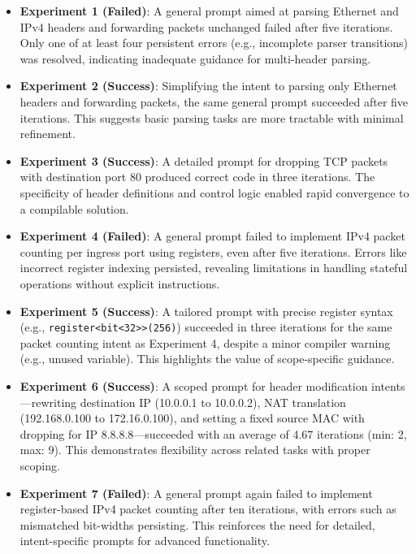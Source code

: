 \documentclass[sigconf]{acmart}
\begin{document}
\begin{itemize}
    \item \textbf{Experiment 1 (Failed)}: A general prompt aimed at parsing Ethernet and IPv4 headers and forwarding packets unchanged failed after five iterations. Only one of at least four persistent errors (e.g., incomplete parser transitions) was resolved, indicating inadequate guidance for multi-header parsing.
    \item \textbf{Experiment 2 (Success)}: Simplifying the intent to parsing only Ethernet headers and forwarding packets, the same general prompt succeeded after five iterations. This suggests basic parsing tasks are more tractable with minimal refinement.
    \item \textbf{Experiment 3 (Success)}: A detailed prompt for dropping TCP packets with destination port 80 produced correct code in three iterations. The specificity of header definitions and control logic enabled rapid convergence to a compilable solution.
    \item \textbf{Experiment 4 (Failed)}: A general prompt failed to implement IPv4 packet counting per ingress port using registers, even after five iterations. Errors like incorrect register indexing persisted, revealing limitations in handling stateful operations without explicit instructions.
    \item \textbf{Experiment 5 (Success)}: A tailored prompt with precise register syntax (e.g., \texttt{register<bit<32>>(256)}) succeeded in three iterations for the same packet counting intent as Experiment 4, despite a minor compiler warning (e.g., unused variable). This highlights the value of scope-specific guidance.
    \item \textbf{Experiment 6 (Success)}: A scoped prompt for header modification intents—rewriting destination IP (10.0.0.1 to 10.0.0.2), NAT translation (192.168.0.100 to 172.16.0.100), and setting a fixed source MAC with dropping for IP 8.8.8.8—succeeded with an average of 4.67 iterations (min: 2, max: 9). This demonstrates flexibility across related tasks with proper scoping.
    \item \textbf{Experiment 7 (Failed)}: A general prompt again failed to implement register-based IPv4 packet counting after ten iterations, with errors such as mismatched bit-widths persisting. This reinforces the need for detailed, intent-specific prompts for advanced functionality.
\end{itemize}
\end{document}
